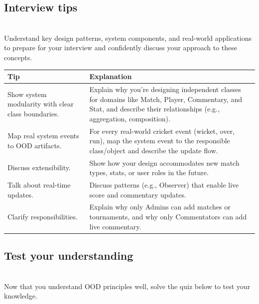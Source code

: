 \subsection{Interview tips}\label{L7T6PVwKzEHtFRjzDohMH}
\\
Understand key design patterns, system components, and real-world applications to prepare for your interview and confidently discuss your approach to these concepts.

\begin{tabular}{|>{\raggedright\arraybackslash}p{5cm}|>{\raggedright\arraybackslash}p{10cm}|}
\hline
\textbf{Tip} & \textbf{Explanation} \\
\hline
Show system modularity with clear class boundaries. & Explain why you’re designing independent classes for domains like Match, Player, Commentary, and Stat, and describe their relationships (e.g., aggregation, composition). \\
\hline
Map real system events to OOD artifacts. & For every real-world cricket event (wicket, over, run), map the system event to the responsible class/object and describe the update flow. \\
\hline
Discuss extensibility. & Show how your design accommodates new match types, stats, or user roles in the future. \\
\hline
Talk about real-time updates. & Discuss patterns (e.g., Observer) that enable live score and commentary updates. \\
\hline
Clarify responsibilities. & Explain why only Admins can add matches or tournaments, and why only Commentators can add live commentary. \\
\hline
\end{tabular}

\subsection{Test your understanding}\label{DWxwDVaw2pz6q4Z0f9ZCZ}
\\
Now that you understand OOD principles well, solve the quiz below to test your knowledge.

